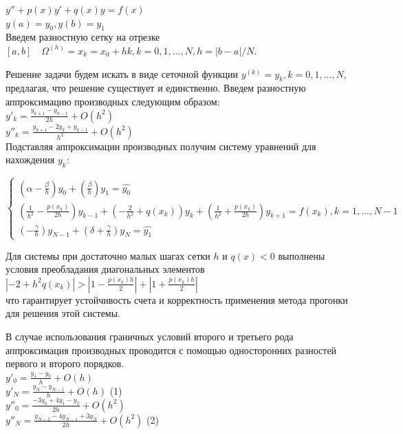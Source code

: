 $y''+p(x)y'+q(x)y=f(x)$\\
$y(a)=y_0, y(b)=y_1$\\

Введем разностную сетку на отрезке $[a, b] \quad \Omega^{(h)}={x_k=x_0+hk}, k=0,1,...,N, h=|b-a|/N$. 

Решение задачи будем искать в виде сеточной функции $y^{(k)}={y_k, k=0,1,...,N}$, предлагая, что решение существует и единственно. Введем разностную аппроксимацию производных следующим образом:\\

$y'_k=\frac{y_{k+1}-y_{k-1}}{2h}+O(h^2)$\\

$y''_k=\frac{y_{k+1}-2y_k+y_{k-1}}{h^2}+O(h^2)$\\

Подставляя аппроксимации производных получим систему уравнений для нахождения $y_k$:

$$
\begin{cases}
(\alpha - \frac{\beta}{h})y_0+(\frac{\beta}{h})y_1=\hat{y_0}\\
(\frac{1}{h^2}-\frac{p(x_k)}{2h})y_{k-1}+(-\frac{2}{h^2}+q(x_k))y_k+(\frac{1}{h^2}+\frac{p(x_k)}{2h})y_{k+1}=f(x_k), k=1,...,N-1\\
(-\frac{\gamma}{h})y_{N-1}+(\delta+\frac{\gamma}{h})y_{N}=\hat{y_1}
\end{cases}
$$

Для системы при достаточно малых шагах сетки $h$ и $q(x)<0$ выполнены условия преобладания диагональных элементов\\

$|-2+h^2q(x_k)|>|1-\frac{p(x_k)h}{2}|+|1+\frac{p(x_k)h}{2}|$\\

что гарантирует устойчивость счета и корректность применения метода прогонки для решения этой системы.

В случае использования граничных условий второго и третьего рода аппроксимация производных проводится с помощью односторонних разностей первого и второго порядков.\\

$y'_0=\frac{y_1-y_0}{h}+O(h)$\\

$y'_N=\frac{y_N-y_{N-1}}{h}+O(h)$ \qquad (1)\\ 

$y''_0=\frac{-3y_0+4y_1-y_2}{2h}+O(h^2)$\\

$y''_N=\frac{y_{N-2}-4y_{N-1}+3y_N}{2h}+O(h^2)$ \qquad (2)\\

